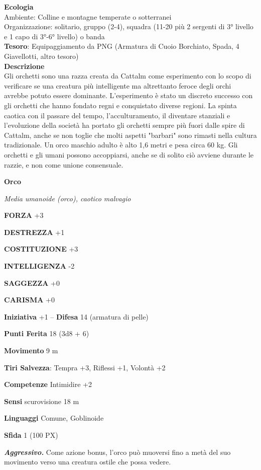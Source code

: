 \begin{multicols}{2}
\textbf{Ecologia}\\
Ambiente: Colline e montagne temperate o sotterranei\\
Organizzazione: solitario, gruppo (2-4), squadra (11-20 più 2 sergenti di 3° livello e 1 capo di 3°-6° livello) o banda \\
\textbf{Tesoro}: Equipaggiamento da PNG (Armatura di Cuoio Borchiato, Spada, 4 Giavellotti, altro tesoro)\\
\textbf{Descrizione}\\
Gli orchetti sono una razza creata da Cattalm come esperimento con lo scopo di verificare se una creatura più intelligente ma altrettanto feroce degli orchi avrebbe potuto essere dominante.
L'esperimento è stato un discreto successo con gli orchetti che hanno fondato regni e conquistato diverse regioni. La spinta caotica con il passare del tempo, l'acculturamento, il diventare stanziali e l'evoluzione della società ha portato gli orchetti sempre più fuori dalle spire di Cattalm, anche se non toglie che molti aspetti "barbari" sono rimasti nella cultura tradizionale.
Un orco maschio adulto è alto 1,6 metri e pesa circa 60 kg. Gli orchetti e gli umani possono accoppiarsi, anche se di solito ciò avviene durante le razzie, e non come unione consensuale.

\medskip{}\textbf{Orco}

\textit{Media umanoide (orco), caotico malvagio}

\textbf{FORZA} +3

\textbf{DESTREZZA} +1

\textbf{COSTITUZIONE} +3

\textbf{INTELLIGENZA} -2

\textbf{SAGGEZZA} +0

\textbf{CARISMA} +0

\textbf{Iniziativa} +1 -- \textbf{Difesa} 14 (armatura di pelle)

\textbf{Punti Ferita} 18 (3d8 + 6)

\textbf{Movimento} 9 m

\textbf{Tiri Salvezza}: Tempra +3, Riflessi +1, Volontà +2

\textbf{Competenze} Intimidire +2

\textbf{Sensi} scurovisione 18 m

\textbf{Linguaggi} Comune, Goblinoide

\textbf{Sfida} 1 (100 PX)

\textit{\textbf{Aggressivo.}} Come azione bonus, l'orco può muoversi fino a metà del suo movimento verso una creatura ostile che possa vedere.


\end{multicols}
